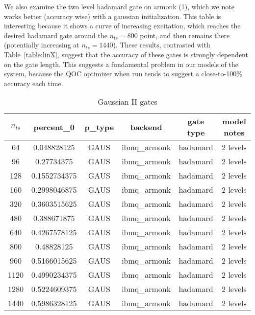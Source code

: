 \documentclass[12pt]{article}
\begin{document}
  We also examine the two level hadamard gate on armonk (\ref{table:gausH}),
  which we note works better (accuracy wise) with a gaussian initialization.
  This table is interesting because it shows a curve of increasing excitation,
  which reaches the desired hadamard gate around the $n_{ts}=800$ point, and
  then remains there (potentially increasing at $n_{ts} = 1440$). These results,
  contrasted with Table~\ref{table:linX}, suggest that the accuracy of these
  gates is strongly dependent on the gate length. This suggests a fundamental
  problem in our models of the system, because the QOC optimizer when run tends
  to suggest a close-to-100\% accuracy each time.

\begin{table}
    \begin{tabular}{||c c c c c c||} 
    \hline
    $n_{ts}$ & percent\_0 & p\_type & backend & gate type & model notes\\ [0.5ex] 
    \hline
64 &0.048828125 &GAUS &ibmq\_armonk &hadamard & 2 levels\\
96 &0.27734375 &GAUS &ibmq\_armonk &hadamard &2 levels\\
128 &0.1552734375 &GAUS &ibmq\_armonk &hadamard &2 levels\\
160 &0.2998046875 &GAUS &ibmq\_armonk &hadamard &2 levels\\
320 &0.3603515625 &GAUS &ibmq\_armonk &hadamard &2 levels\\
480 &0.388671875 &GAUS &ibmq\_armonk &hadamard &2 levels\\
640 &0.4267578125 &GAUS &ibmq\_armonk &hadamard &2 levels\\
800 &0.48828125 &GAUS &ibmq\_armonk &hadamard &2 levels\\
960 &0.5166015625 &GAUS &ibmq\_armonk &hadamard &2 levels\\
1120 &0.4990234375 &GAUS &ibmq\_armonk &hadamard &2 levels\\
1280 &0.5224609375 &GAUS &ibmq\_armonk &hadamard &2 levels\\
1440 &0.5986328125 &GAUS &ibmq\_armonk &hadamard &2 levels\\
    \hline
   \end{tabular}
   \caption{Gaussian H gates}
   \label{table:gausH}
\end{table}
\end{document}
